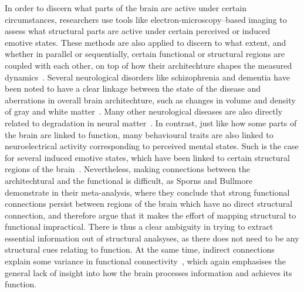\documentclass[10pt]{article}\usepackage[]{graphicx}\usepackage[]{color}
\theoremstyle{plain}
\begin{document}
\begin{multicols*}{2}
		In order to discern what parts of the brain are active under certain circumstances, researchers use tools like electron-microscopy--based imaging to assess what structural parts are active under certain perceived or induced emotive states. These methods are also applied to discern to what extent, and whether in parallel or sequentially, certain functional or structural regions are coupled with each other, on top of how their architechture shapes the measured dynamics~\cite{kotter2001neuroscience,shepherd1998human}.	Several neurological disorders like schizophrenia and dementia have been noted to have a clear linkage between the state of the disease and aberrations in overall brain architechture, such as changes in volume and density of gray and white matter~\cite{bressler2010large}. Many other neurological diseases are also directly related to degradation in neural matter~\cite{ross2004protein}. In contrast, just like how some parts of the brain are linked to function, many behavioural traits are also linked to neuroelectrical activity corresponding to perceived mental states. Such is the case for several induced emotive states, which have been linked to certain structural regions of the brain~\cite{fox1988patterns}. Nevertheless, making connections between the architechtural and the functional is difficult, as Sporns and Bullmore~\cite{honey2009predicting} demonstrate in their meta-analysis, where they conclude that strong functional connections persist between regions of the brain which have no direct structural connection, and therefore argue that it makes the effort of mapping structural to functional impractical. There is thus a clear ambiguity in trying to extract essential information out of structural analsyses, as there does not need to be any structural cues relating to function. At the same time, indirect connections explain some variance in functional connectivity~\cite{park2013structural}, which again emphasises the general lack of insight into how the brain processes information and achieves its function. 
					          

\end{multicols*}
\end{document}
